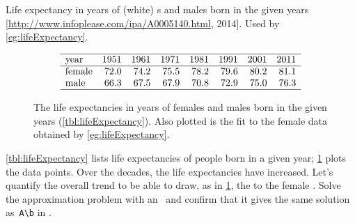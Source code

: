 \begin{example} \label{eg:lifeExpectancy}
\begin{table}
\caption{Life expectancy in years of (white) s and males born in the given years  [\url{http://www.infoplease.com/ipa/A0005140.html}, 2014].  Used by \cref{eg:lifeExpectancy}.}
\label{tbl:lifeExpectancy}
\begin{equation*}
\begin{array}{lrrrrrrrr} \hline
\text{year}&1951&1961&1971&1981&1991&2001&2011\\\hline
\text{female}&72.0&74.2&75.5&78.2&79.6&80.2&81.1\\
\text{male}&66.3&67.5&67.9&70.8&72.9&75.0&76.3\\\hline
\end{array}
\end{equation*}
\end{table}
\begin{figure}
\centering

\caption{The life expectancies in years of females and males born in the given years (\cref{tbl:lifeExpectancy}).  
Also plotted is the  fit to the female data obtained by \cref{eg:lifeExpectancy}.}
\label{fig:lifeExpectancy}
\end{figure}
\cref{tbl:lifeExpectancy} lists life expectancies of people born in a given year; \cref{fig:lifeExpectancy} plots the data points.
Over the decades, the life expectancies have increased.
Let's quantify the overall trend to be able to draw, as in 
\cref{fig:lifeExpectancy}, the  to the 
female .
Solve the approximation problem with an \svd\ and confirm that it gives the same solution as~\verb|A\b| in \script.



\end{example}
